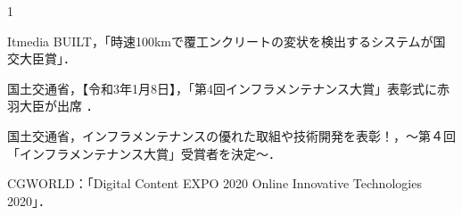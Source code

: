\begin{報道}{1}

Itmedia BUILT，「時速100kmで覆工ンクリートの変状を検出するシステムが国交大臣賞」．
 
国土交通省，【令和3年1月8日】，「第4回インフラメンテナンス大賞」表彰式に赤羽大臣が出席 ．

国土交通省，インフラメンテナンスの優れた取組や技術開発を表彰！，～第４回「インフラメンテナンス大賞」受賞者を決定～．　

CGWORLD：「Digital Content EXPO 2020 Online Innovative Technologies 2020」．


\end{報道}
